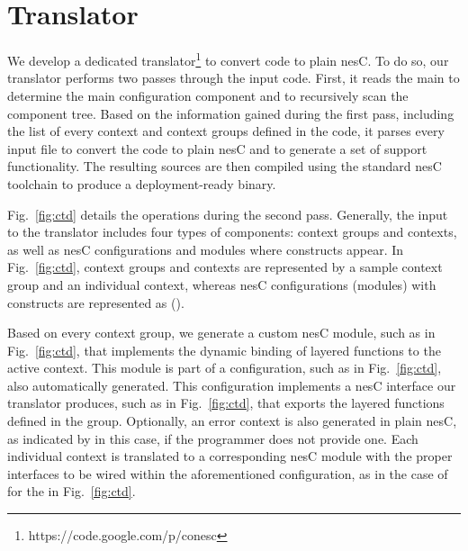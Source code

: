  \section{Translator}\label{sec:translator}

 We develop a dedicated translator\footnote{https://code.google.com/p/conesc} to convert \conesc code to plain
 nesC. To do so, our translator performs two passes through the input
 code. First, it reads the main  to determine the main
 configuration component and to recursively scan the component
 tree. Based on the information gained during the first pass,
 including the list of every context and context groups defined in the
 code, it parses every input file to convert the \conesc code to plain
 nesC and to generate a set of support functionality. The resulting
 sources are then compiled using the standard nesC toolchain to
 produce a deployment-ready binary.


Fig.~\ref{fig:ctd} details the operations during the second
pass. Generally, the input to the translator includes four types of
components: context groups and contexts, as well as nesC
configurations and modules where \conesc constructs appear.  In
Fig.~\ref{fig:ctd}, context groups and contexts are represented by a
sample  context group and an individual 
context, whereas nesC configurations (modules) with \conesc
constructs are represented as  ().

Based on every context group, we generate a custom nesC module, such
as  in Fig.~\ref{fig:ctd}, that implements the
dynamic binding of layered functions to the active context. This
module is part of a configuration, such as  in
Fig.~\ref{fig:ctd}, also automatically generated. This configuration
implements a nesC interface our translator produces, such as
 in Fig.~\ref{fig:ctd}, that exports the layered
functions defined in the group. Optionally, an error context is also
generated in plain nesC, as indicated by  in this
case, if the programmer does not provide one. Each individual context
is translated to a corresponding nesC module with the proper
interfaces to be wired within the aforementioned configuration, as in
the case of  for the  in
Fig.~\ref{fig:ctd}.

